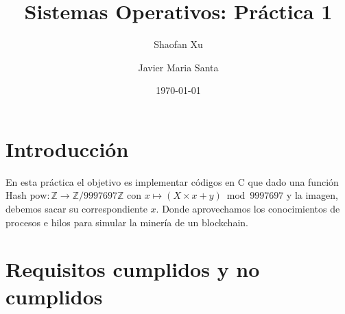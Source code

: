 \documentclass[12pt,a4paper]{article}
\title{\textbf{Sistemas Operativos: Práctica 1}}
\author{
    Shaofan Xu \\
    \and 
    Javier Maria Santa
    }
\date{\today}
\begin{document}
\maketitle

\clearpage
\section{Introducción}
En esta práctica el objetivo es implementar códigos en C que dado una función Hash $\mathrm{pow}:\mathbb{Z}\to \mathbb{Z}/9997697\mathbb{Z}$
con $x \mapsto (X\times x+y) \bmod 9997697$ y la imagen, debemos sacar su correspondiente $x$. Donde aprovechamos los conocimientos de 
procesos e hilos para simular la minería de un blockchain.
\section{Requisitos cumplidos y no cumplidos}
\end{document}
